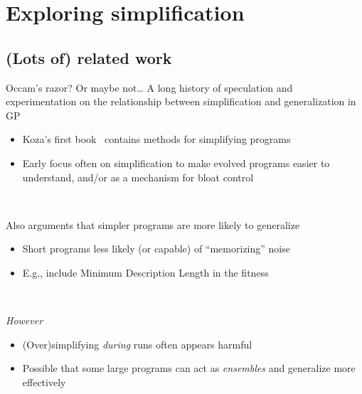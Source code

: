 \documentclass{beamer}
\begin{document}
\section{Exploring simplification}

\subsection{(Lots of) related work}

\begin{frame}{Occam's razor? Or maybe not\ldots}
A long history of speculation and experimentation on the relationship between simplification and generalization in GP
\begin{itemize}
	\item Koza's first book~\cite{koza1992genetic} contains methods for simplifying programs
	\item Early focus often on simplification to make evolved programs easier to understand, and/or as a mechanism for bloat control
\end{itemize}

~

Also arguments that simpler programs are more likely to generalize~\cite{hooper:1996:iarGPes}
\begin{itemize}
	\item Short programs less likely (or capable) of ``memorizing'' noise
	\item E.g., include Minimum Description Length in the fitness~\cite{iba1994genetic}
\end{itemize}

~

\emph{However}
\begin{itemize}
	\item (Over)simplifying \emph{during} runs often appears harmful
	\item Possible that some large programs can act as \emph{ensembles} and generalize more effectively~\cite{gonccalves2015generalization}
\end{itemize}


\end{frame}
\end{document}
